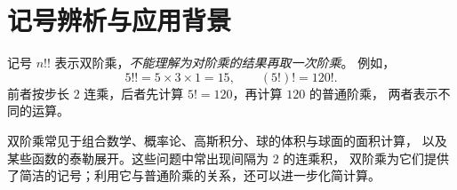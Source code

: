 \documentclass[UTF8,12pt,a4paper,fontset=fandol]{ctexart}
\begin{document}
\section{记号辨析与应用背景}

记号 $n!!$ 表示双阶乘，\emph{不能理解为对阶乘的结果再取一次阶乘}。
例如，
\[
  5!!=5\times3\times1=15,\qquad (5!)!=120!.
\]
前者按步长 $2$ 连乘，后者先计算 $5!=120$，再计算 $120$ 的普通阶乘，
两者表示不同的运算。

双阶乘常见于组合数学、概率论、高斯积分、球的体积与球面的面积计算，
以及某些函数的泰勒展开。这些问题中常出现间隔为 $2$ 的连乘积，
双阶乘为它们提供了简洁的记号；利用它与普通阶乘的关系，还可以进一步化简计算。
\end{document}
